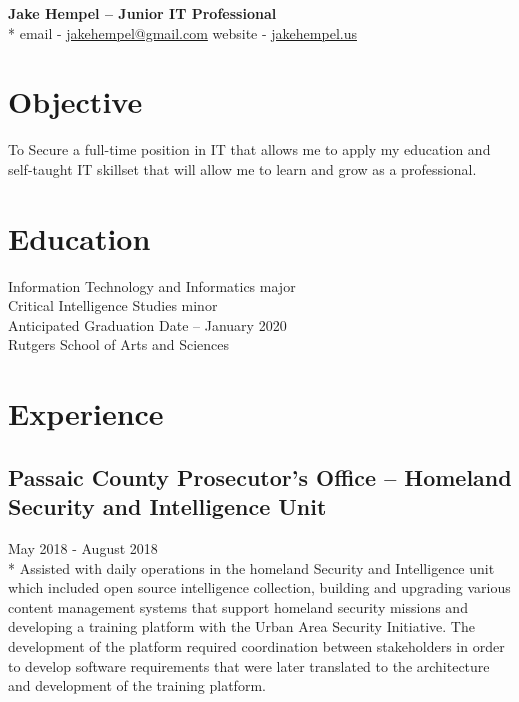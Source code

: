 \documentclass{article}
\begin{document}
\begin{samepage}

\begin{center}
\huge{\textbf{Jake Hempel -- Junior IT Professional}} \\*
\large{email - \href{mailto:jakehempel@gmail.com}{jakehempel@gmail.com}
website - \href{jakehempel.us}{jakehempel.us}}
\end{center}

\section{Objective}
To Secure a full-time position in IT that allows me to apply my education and self-taught IT skillset that will allow me to learn and grow as a professional. 


\section{Education}
Information Technology and Informatics major\\
Critical Intelligence Studies minor\\
Anticipated Graduation Date -- January 2020\\
Rutgers School of Arts and Sciences


\section{Experience}

\subsection{Passaic County Prosecutor's Office -- Homeland Security and Intelligence Unit}
May 2018 - August 2018\\*
Assisted with daily operations in the homeland Security and Intelligence unit which included open source intelligence collection, building and upgrading various content management systems that support homeland security missions and developing a training platform with the Urban Area Security Initiative.  The development of the platform required coordination between stakeholders in order to develop software requirements that were later translated to the architecture and development of the training platform.


\end{samepage}
\end{document}
